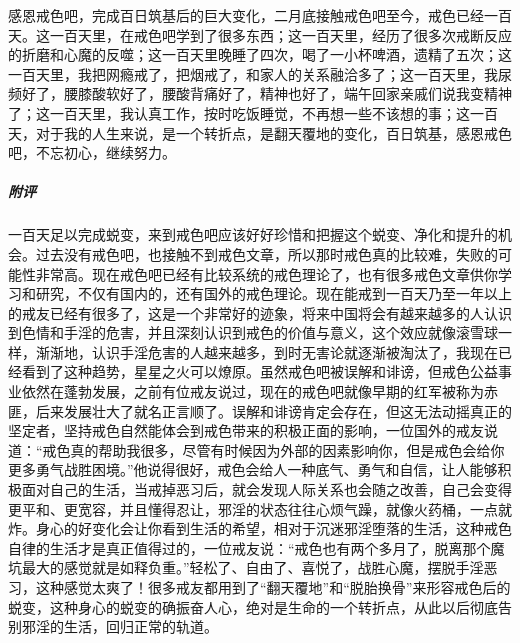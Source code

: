 \begin{case}
    感恩戒色吧，完成百日筑基后的巨大变化，二月底接触戒色吧至今，戒色已经一百天。这一百天里，在戒色吧学到了很多东西；这一百天里，经历了很多次戒断反应的折磨和心魔的反噬；这一百天里晚睡了四次，喝了一小杯啤酒，遗精了五次；这一百天里，我把网瘾戒了，把烟戒了，和家人的关系融洽多了；这一百天里，我尿频好了，腰膝酸软好了，腰酸背痛好了，精神也好了，端午回家亲戚们说我变精神了；这一百天里，我认真工作，按时吃饭睡觉，不再想一些不该想的事；这一百天，对于我的人生来说，是一个转折点，是翻天覆地的变化，百日筑基，感恩戒色吧，不忘初心，继续努力。
    \subparagraph{附评} 一百天足以完成蜕变，来到戒色吧应该好好珍惜和把握这个蜕变、净化和提升的机会。过去没有戒色吧，也接触不到戒色文章，所以那时戒色真的比较难，失败的可能性非常高。现在戒色吧已经有比较系统的戒色理论了，也有很多戒色文章供你学习和研究，不仅有国内的，还有国外的戒色理论。现在能戒到一百天乃至一年以上的戒友已经有很多了，这是一个非常好的迹象，将来中国将会有越来越多的人认识到色情和手淫的危害，并且深刻认识到戒色的价值与意义，这个效应就像滚雪球一样，渐渐地，认识手淫危害的人越来越多，到时无害论就逐渐被淘汰了，我现在已经看到了这种趋势，星星之火可以燎原。虽然戒色吧被误解和诽谤，但戒色公益事业依然在蓬勃发展，之前有位戒友说过，现在的戒色吧就像早期的红军被称为赤匪，后来发展壮大了就名正言顺了。误解和诽谤肯定会存在，但这无法动摇真正的坚定者，坚持戒色自然能体会到戒色带来的积极正面的影响，一位国外的戒友说道：“戒色真的帮助我很多，尽管有时候因为外部的因素影响你，但是戒色会给你更多勇气战胜困境。”他说得很好，戒色会给人一种底气、勇气和自信，让人能够积极面对自己的生活，当戒掉恶习后，就会发现人际关系也会随之改善，自己会变得更平和、更宽容，并且懂得忍让，邪淫的状态往往心烦气躁，就像火药桶，一点就炸。身心的好变化会让你看到生活的希望，相对于沉迷邪淫堕落的生活，这种戒色自律的生活才是真正值得过的，一位戒友说：“戒色也有两个多月了，脱离那个魔坑最大的感觉就是如释负重。”轻松了、自由了、喜悦了，战胜心魔，摆脱手淫恶习，这种感觉太爽了！很多戒友都用到了“翻天覆地”和“脱胎换骨”来形容戒色后的蜕变，这种身心的蜕变的确振奋人心，绝对是生命的一个转折点，从此以后彻底告别邪淫的生活，回归正常的轨道。
\end{case}

